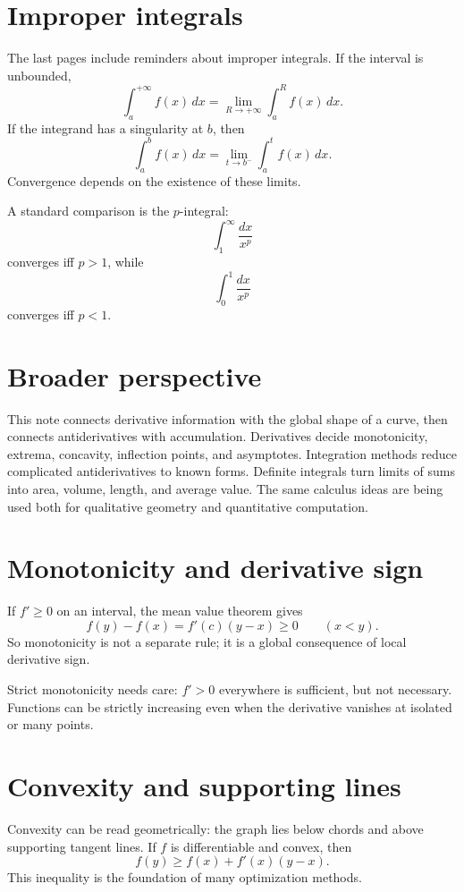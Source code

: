 \section{Improper integrals}

The last pages include reminders about improper integrals.  If the interval is unbounded,
\[
  \int_a^{+\infty}f(x)\,dx
  =
  \lim_{R\to+\infty}\int_a^R f(x)\,dx.
\]
If the integrand has a singularity at $b$, then
\[
  \int_a^b f(x)\,dx
  =
  \lim_{t\to b^-}\int_a^t f(x)\,dx.
\]
Convergence depends on the existence of these limits.

A standard comparison is the $p$-integral:
\[
  \int_1^\infty 
\frac{dx}{x^p}
\]
converges iff $p>1$, while
\[
  \int_0^1 
\frac{dx}{x^p}
\]
converges iff $p<1$.

\section{Broader perspective}

This note connects derivative information with the global shape of a curve, then connects antiderivatives with accumulation.  Derivatives decide monotonicity, extrema, concavity, inflection points, and asymptotes.  Integration methods reduce complicated antiderivatives to known forms.  Definite integrals turn limits of sums into area, volume, length, and average value.  The same calculus ideas are being used both for qualitative geometry and quantitative computation.

\section{Monotonicity and derivative sign}

If \(f'\ge0\) on an interval, the mean value theorem gives
\[
  f(y)-f(x)=f'(c)(y-x)\ge0\qquad (x<y).
\]
So monotonicity is not a separate rule; it is a global consequence of local derivative sign.

Strict monotonicity needs care: \(f'>0\) everywhere is sufficient, but not necessary.  Functions can be strictly increasing even when the derivative vanishes at isolated or many points.

\section{Convexity and supporting lines}

Convexity can be read geometrically: the graph lies below chords and above supporting tangent lines.  If \(f\) is differentiable and convex, then
\[
  f(y)\ge f(x)+f'(x)(y-x).
\]
This inequality is the foundation of many optimization methods.

